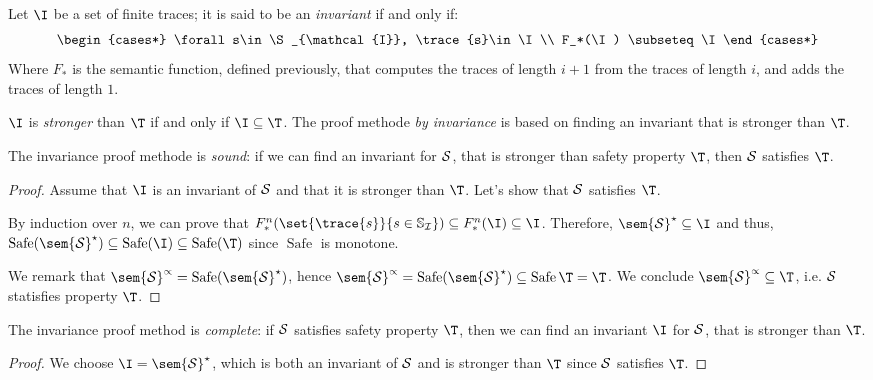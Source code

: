 \documentclass[toc, titlepaged]{../cs-classes/cs-classes}
\DeclareMathOperator{\safe}{Safe}
\begin{document}
\begin{definition}
    Let $\I$ be a set of finite traces; it is said to be an \emph{invariant} if and only if:
    \begin{equation*}
        \begin{cases*}
            \forall s\in\S_{\mathcal{I}}, \trace{s}\in\I\\
            F_*(\I) \subseteq\I
        \end{cases*}
    \end{equation*}
    Where $F_*$ is the semantic function, defined previously, that computes the traces of length $i+1$ from the traces of length $i$, and adds the traces of length $1$.

    $\I$ is \emph{stronger} than $\T$ if and only if $\I\subseteq\T$. The proof methode \emph{by invariance} is based on finding an invariant that is stronger than $\T$.
\end{definition}

\begin{theorem}
    The invariance proof methode is \emph{sound}: if we can find an invariant for $\mathcal{S}$, that is stronger than safety property $\T$, then $\mathcal{S}$ satisfies $\T$.
\end{theorem}
\begin{proof}
    Assume that $\I$ is an invariant of $\mathcal{S}$ and that it is stronger than $\T$. Let's show that $\mathcal{S}$ satisfies $\T$.

    By induction over $n$, we can prove that $F_*^n(\set{\trace{s}}{s\in\S_{\mathcal{I}}}) \subseteq F_*^n(\I) \subseteq \I$. Therefore, $\sem{\Sc}^\star \subseteq \I$ and thus, $\safe(\sem{\Sc}^\star)\subseteq\safe(\I)\subseteq\safe(\T)$ since $\safe$ is monotone.

    We remark that $\sem{\Sc}^\propto = \safe(\sem{\Sc}^\star)$, hence $\sem{\Sc}^\propto = \safe(\sem{\Sc}^\star) \subseteq \safe{\T} = \T$. We conclude $\sem{\Sc}^\propto \subseteq \T$, i.e. $\mathcal{S}$ statisfies property $\T$.
\end{proof}

\begin{theorem}
    The invariance proof method is \emph{complete}: if $\mathcal{S}$ satisfies safety property $\T$, then we can find an invariant $\I$ for $\mathcal{S}$, that is stronger than $\T$.    
\end{theorem}
\begin{proof}
    We choose $\I = \sem{\Sc}^\star$, which is both an invariant of $\mathcal{S}$ and is stronger than $\T$ since $\mathcal{S}$ satisfies $\T$.
\end{proof}
\end{document}
